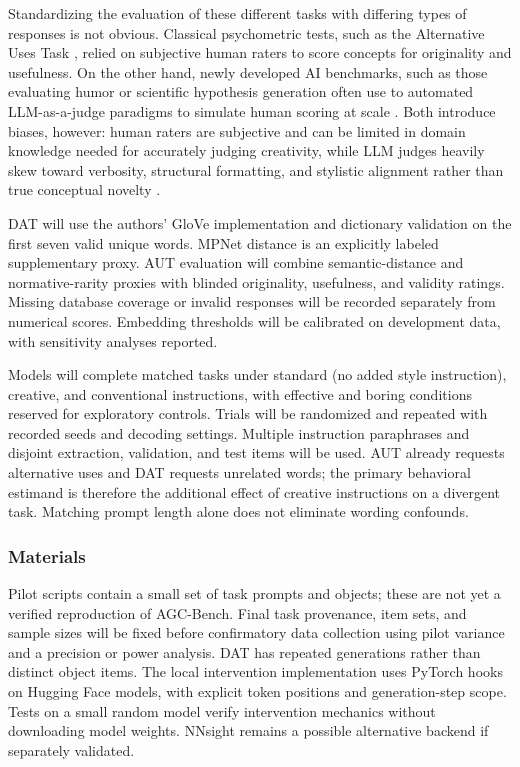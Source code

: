 \documentclass{article}
\begin{document}
Standardizing the evaluation of these different tasks with differing types of responses is not obvious. Classical psychometric tests, such as the Alternative Uses Task \parencite{guilford1967creativity}, relied on subjective human raters to score concepts for originality and usefulness. On the other hand, newly developed AI benchmarks, such as those evaluating humor or scientific hypothesis generation often use to automated LLM-as-a-judge paradigms to simulate human scoring at scale \parencite{wang2024large}. Both introduce biases, however: human raters are subjective and can be limited in domain knowledge needed for accurately judging creativity, while LLM judges heavily skew toward verbosity, structural formatting, and stylistic alignment rather than true conceptual novelty \parencite{saito2023verbosity}.

DAT will use the authors' GloVe implementation and dictionary validation on the first seven valid unique words. MPNet distance is an explicitly labeled supplementary proxy. AUT evaluation will combine semantic-distance and normative-rarity proxies with blinded originality, usefulness, and validity ratings. Missing database coverage or invalid responses will be recorded separately from numerical scores. Embedding thresholds will be calibrated on development data, with sensitivity analyses reported.

Models will complete matched tasks under standard (no added style instruction), creative, and conventional instructions, with effective and boring conditions reserved for exploratory controls. Trials will be randomized and repeated with recorded seeds and decoding settings. Multiple instruction paraphrases and disjoint extraction, validation, and test items will be used. AUT already requests alternative uses and DAT requests unrelated words; the primary behavioral estimand is therefore the additional effect of creative instructions on a divergent task. Matching prompt length alone does not eliminate wording confounds.


\subsubsection{Materials}
Pilot scripts contain a small set of task prompts and objects; these are not yet a verified reproduction of AGC-Bench. Final task provenance, item sets, and sample sizes will be fixed before confirmatory data collection using pilot variance and a precision or power analysis. DAT has repeated generations rather than distinct object items. The local intervention implementation uses PyTorch hooks on Hugging Face models, with explicit token positions and generation-step scope. Tests on a small random model verify intervention mechanics without downloading model weights. NNsight remains a possible alternative backend if separately validated.
\end{document}
